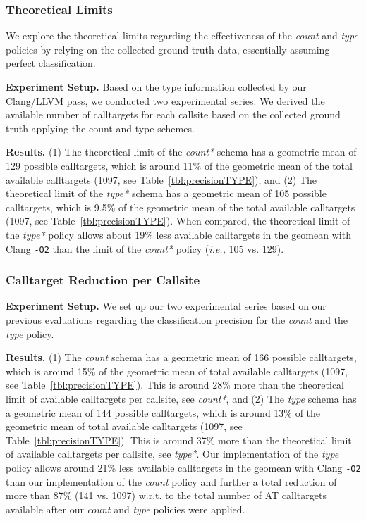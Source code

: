 \subsubsection{Theoretical Limits}
\label{subsection:theoreticallimit}
We explore the theoretical limits regarding the effectiveness of the \textit{count} and \textit{type} policies by relying on the collected ground truth data, essentially assuming perfect classification.

\textbf{Experiment Setup.} Based on the type information collected by our Clang/LLVM pass, we conducted two experimental series.
We derived the available number of calltargets for each callsite based on the collected ground truth applying the {count} and {type} schemes.

\textbf{Results.}
(1) The theoretical limit of the \textit{count*} schema has a geometric mean of 129 possible calltargets, which is around 11\% of the geometric mean of the total available calltargets (1097, see Table~\ref{tbl:precisionTYPE}), and
(2) The theoretical limit of the \textit{type*} schema has a geometric mean of 105 possible calltargets, which is 9.5\% of the geometric mean of the total available calltargets (1097, see Table~\ref{tbl:precisionTYPE}).
When compared, the theoretical limit of the \textit{type*} policy allows about 19\% less available calltargets in the geomean with Clang \texttt{-O2} than the limit of the \textit{count*} policy (\textit{i.e.,} 105 vs. 129).

\subsubsection{Calltarget Reduction per Callsite}
\label{subsection:typeshieldvslimitcount}
\textit{}

\textbf{Experiment Setup.} We set up our two experimental series based on our previous evaluations regarding the classification precision for the \textit{count} and the \textit{type} policy.

\textbf{Results.}
(1) The \textit{count} schema has a geometric mean of 166 possible calltargets, which is around 15\% of the geometric mean of total available calltargets (1097, see Table~\ref{tbl:precisionTYPE}). 
This is around 28\% more than the theoretical limit of available calltargets per callsite, see \textit{count*}, and
(2)  The \textit{type} schema has a geometric mean of 144 possible calltargets, which is around 13\% of the geometric mean of total available calltargets (1097, see Table~\ref{tbl:precisionTYPE}). 
This is around 37\% more than the theoretical limit of available calltargets per callsite, see \textit{type*}.
Our implementation of the \textit{type} policy allows around 21\% less available calltargets in the geomean with Clang \texttt{-O2} than our implementation of the \textit{count} policy and 
further a total reduction of more than 87\% (141 vs. 1097) w.r.t. to the total number of AT calltargets available after our \textit{count} and \textit{type} policies were applied. 


